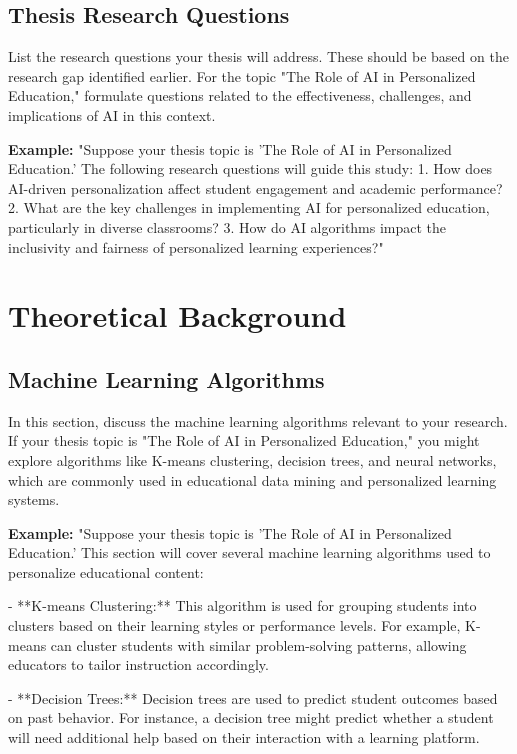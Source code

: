 \documentclass[english,f,master,binding,twoside,palatino, scrreprt]{WeSTthesis}
\begin{document}
\section{Thesis Research Questions}
List the research questions your thesis will address. These should be based on the research gap identified earlier. For the topic "The Role of AI in Personalized Education," formulate questions related to the effectiveness, challenges, and implications of AI in this context.

\textbf{Example:}  
"Suppose your thesis topic is 'The Role of AI in Personalized Education.' The following research questions will guide this study:
1. How does AI-driven personalization affect student engagement and academic performance?
2. What are the key challenges in implementing AI for personalized education, particularly in diverse classrooms?
3. How do AI algorithms impact the inclusivity and fairness of personalized learning experiences?"

\chapter{Theoretical Background}

\section{Machine Learning Algorithms}
In this section, discuss the machine learning algorithms relevant to your research. If your thesis topic is "The Role of AI in Personalized Education," you might explore algorithms like K-means clustering, decision trees, and neural networks, which are commonly used in educational data mining and personalized learning systems.

\textbf{Example:}  
"Suppose your thesis topic is 'The Role of AI in Personalized Education.' This section will cover several machine learning algorithms used to personalize educational content:

- **K-means Clustering:** This algorithm is used for grouping students into clusters based on their learning styles or performance levels. For example, K-means can cluster students with similar problem-solving patterns, allowing educators to tailor instruction accordingly.

- **Decision Trees:** Decision trees are used to predict student outcomes based on past behavior. For instance, a decision tree might predict whether a student will need additional help based on their interaction with a learning platform.
\end{document}
